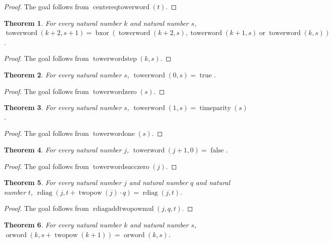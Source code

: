 \documentclass[11pt]{article}
\newtheorem{theorem}{Theorem}[section]
\theoremstyle{definition}
\begin{document}
\begin{proof}
The goal follows from \(\operatorname{centereqtowerword}(t)\).
\end{proof}
\begin{theorem}
\label{ll:observations:tower-word-step}
For every natural number \(k\) and natural number \(s\), \(\operatorname{towerword}(k + 2, s + 1) = \operatorname{bxor}(\operatorname{towerword}(k + 2, s), \operatorname{towerword}(k + 1, s) \operatorname{or} \operatorname{towerword}(k, s))\).
\end{theorem}
\begin{proof}
The goal follows from \(\operatorname{towerwordstep}(k, s)\).
\end{proof}
\begin{theorem}
\label{ll:observations:tower-word-zero}
For every natural number \(s\), \(\operatorname{towerword}(0, s) = \operatorname{true}\).
\end{theorem}
\begin{proof}
The goal follows from \(\operatorname{towerwordzero}(s)\).
\end{proof}
\begin{theorem}
\label{ll:observations:tower-word-one}
For every natural number \(s\), \(\operatorname{towerword}(1, s) = \operatorname{timeparity}(s)\).
\end{theorem}
\begin{proof}
The goal follows from \(\operatorname{towerwordone}(s)\).
\end{proof}
\begin{theorem}
\label{ll:observations:tower-word-succ-zero}
For every natural number \(j\), \(\operatorname{towerword}(j + 1, 0) = \operatorname{false}\).
\end{theorem}
\begin{proof}
The goal follows from \(\operatorname{towerwordsucczero}(j)\).
\end{proof}
\begin{theorem}
\label{ll:observations:rdiag-add-twopow-mul}
For every natural number \(j\) and natural number \(q\) and natural number \(t\), \(\operatorname{rdiag}(j, t + \operatorname{twopow}(j) \cdot q) = \operatorname{rdiag}(j, t)\).
\end{theorem}
\begin{proof}
The goal follows from \(\operatorname{rdiagaddtwopowmul}(j, q, t)\).
\end{proof}
\begin{theorem}
\label{ll:observations:or-word-periodic}
For every natural number \(k\) and natural number \(s\), \(\operatorname{orword}(k, s + \operatorname{twopow}(k + 1)) = \operatorname{orword}(k, s)\).
\end{theorem}
\end{document}
